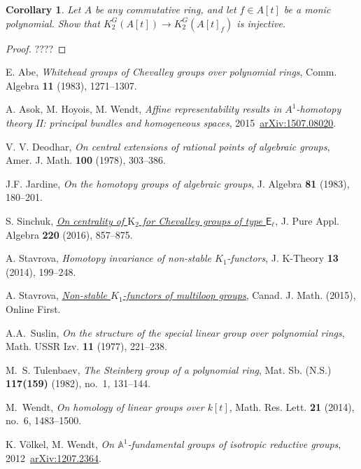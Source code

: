 \documentclass[oneside,12pt]{amsart}
\numberwithin{equation}{section}
\numberwithin{lem}{section}
\newtheorem{cor}[lem]{Corollary}
\theoremstyle{definition}
\theoremstyle{remark}
\newcommand{\Aff}{\mathbb {A}}
\newcommand{\rE}{\mathsf{E}}
\begin{document}
\begin{cor}
 Let $A$ be any commutative ring, and let $f\in A[t]$ be a monic polynomial. Show that
$K_2^G(A[t])\to K_2^G(A[t]_f)$ is injective.
\end{cor}
\begin{proof}
????
\end{proof}

\renewcommand{\refname}{References}
\begin{thebibliography}{MMMM}

 E. Abe, 
{\it Whitehead groups of Chevalley groups over polynomial rings},
Comm. Algebra {\bf 11} (1983), 1271--1307.

 A. Asok, M. Hoyois, M. Wendt, 
{\it Affine representability results in $A^1$-homotopy theory II: principal bundles and homogeneous spaces},
2015~\href{http://arxiv.org/abs/1507.08020}{arXiv:1507.08020}.

 V. V. Deodhar,
{\it On central extensions of rational points of algebraic groups}, 
Amer. J. Math. {\bf 100} (1978), 303--386.

 J.F. Jardine, 
{\it On the homotopy groups of algebraic groups}, 
J. Algebra {\bf 81} (1983), 180--201.

 S. Sinchuk,
{\it \href{http://dx.doi.org/10.1016/j.jpaa.2015.08.003}{On centrality of $\mathrm{K}_2$ for {C}hevalley groups of type $\rE_\ell$}},
J. Pure Appl. Algebra {\bf 220} (2016), 857--875.

 A. Stavrova, 
{\it Homotopy invariance of non-stable $K_1$-functors}, 
J. K-Theory {\bf 13} (2014), 199--248.

 A. Stavrova, 
{\it \href{http://dx.doi.org/10.4153/CJM-2015-035-2}{Non-stable $K_1$-functors of multiloop groups}},
Canad. J. Math. (2015), Online First.

 A.A.~Suslin,
{\it On the structure of the special linear group over polynomial rings},
Math. USSR Izv. {\bf 11} (1977), 221--238.

M.~S. Tulenbaev, \emph{The {S}teinberg group of a polynomial ring}, 
Mat. Sb. (N.S.) \textbf{117(159)} (1982), no.~1, 131--144.

M.~Wendt, \emph{On homology of linear groups over {$k[t]$}},
Math. Res. Lett. \textbf{21} (2014), no.~6, 1483--1500.

 K. V\"olkel, M. Wendt, 
{\it On $\Aff^1$-fundamental groups of isotropic reductive groups},
2012~\href{http://arxiv.org/abs/1207.2364}{arXiv:1207.2364}.

\end{thebibliography}
\end{document}
